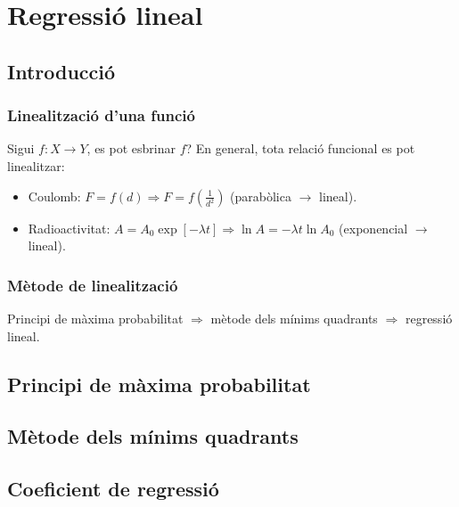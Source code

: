 \section{Regressió lineal}
\subsection{Introducció}
\subsubsection*{Linealització d'una funció}
Sigui $f: X \to Y$, es pot esbrinar $f$? En general, tota relació funcional es pot linealitzar:
\begin{itemize}
    \item Coulomb: $F = f(d) \Rightarrow F = f(\frac{1}{d^{2}})$ (parabòlica $\to$ lineal).
    \item Radioactivitat: $A = A_{0} \exp [- \lambda t] \Rightarrow \ln A = - \lambda t \ln A_{0}$ (exponencial $\to$ lineal).
\end{itemize}

\subsubsection*{Mètode de linealització}
Principi de màxima probabilitat $\Rightarrow$ mètode dels mínims quadrants $\Rightarrow$ regressió lineal.

\subsection{Principi de màxima probabilitat}

\subsection{Mètode dels mínims quadrants}

\subsection{Coeficient de regressió}